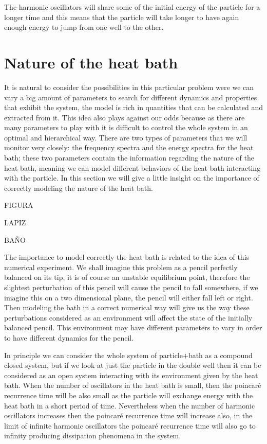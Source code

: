 The harmonic oscillators will share some of the initial energy of the particle for a longer time and  this means that the particle will take longer to have again enough energy to jump from one well to the other. 



\section{Nature of the heat bath}
It is natural to consider the possibilities in this particular problem were we can vary a big amount of parameters to search for different dynamics and properties that exhibit the system, the model is rich in quantities that can be calculated and extracted from it. This idea also plays against our odds because as there are many parameters to play with it is difficult to control the whole system in an optimal and hierarchical way. There are two types of parameters that we will monitor very closely: the frequency spectra and the energy spectra for the heat bath; these two parameters contain the information regarding the nature of the heat bath, meaning we can model different behaviors of the heat bath interacting with the particle. In this section we will give a little insight on the importance of correctly modeling the nature of the heat bath.


FIGURA\par
LAPIZ\par 
BAÑO\par 

The importance to model correctly the heat bath is related to the idea of this numerical experiment. We shall imagine this problem as a pencil perfectly balanced on its tip, it is of course an unstable equilibrium point, therefore the slightest perturbation of this pencil will cause the pencil to fall somewhere, if we imagine this on a two dimensional plane, the pencil will either fall left or right. Then modeling the bath in a correct numerical way will give us the way these perturbations considered as an environment will affect the state of the initially balanced pencil. This environment may have different parameters to vary in order to have different dynamics for the pencil.\par 

In principle we can consider the whole system of particle$+$bath as a compound closed system, but if we look at just the particle in the double well then it can be considered as an open system interacting with its environment given by the heat bath. When the number of oscillators in the heat bath is small, then the poincaré recurrence time will be also small as the particle will exchange energy with the heat bath in a short period of time. Nevertheless when the number of harmonic oscillators increases then the poincaré recurrence time will increase also, in the limit of infinite harmonic oscillators the poincaré recurrence time will also go to infinity producing dissipation phenomena in the system\cite{mazur1960poincare}.


